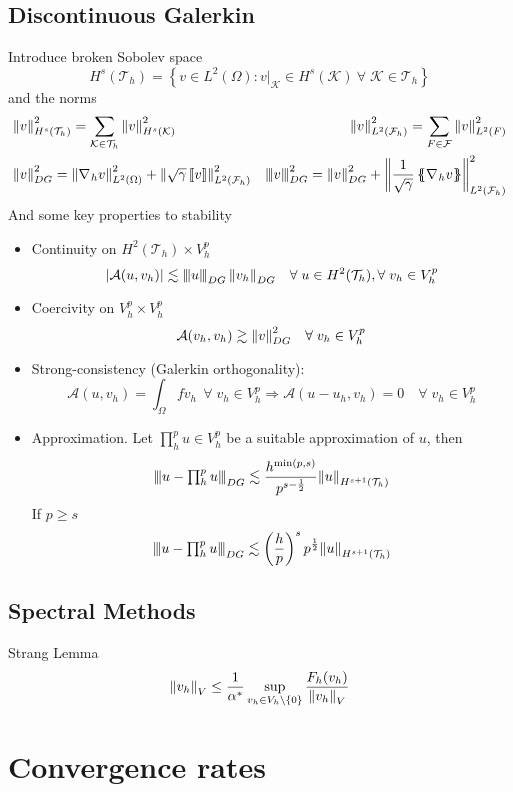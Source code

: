 \documentclass[a4paper,11pt]{article}
\theoremstyle{break}
\renewcommand*{\grad}{\nabla\mspace{1mu}}
\newcommand*{\limited}[1]{\vert_{#1}}
\newcommand*{\threenorm}[3][\null]{\left\lvert\mspace{-2mu}\left\lvert\mspace{-2mu}\left\lvert#2\right\rvert\mspace{-2mu}\right\rvert\mspace{-2mu}\right\rvert_{#3}^{#1}}
\newcommand{\ltwonorm}[1]{\norm{#1}_{L^2(\Omega)}}
\newcommand{\jump}[1]{\left[\!\left[#1\right]\!\right]}
\newcommand{\average}[1]{\left\{\mspace{-6.5mu}\left\{#1\right\}\mspace{-6.5mu}\right\}}
\newcommand{\element}{\mathcal{K}}
\newcommand{\triangulation}{\mathcal{T}_h}
\newcommand{\eit}{{\element\in\triangulation}}
\numberwithin{equation}{section}
\begin{document}
\subsection*{Discontinuous Galerkin}
Introduce broken Sobolev space
\[
    H^s(\triangulation) = \left\{ v \in L^2(\Omega) : v\limited{\element} \in H^s(\element) \ \forall \; \eit \right\}
\]
and the norms 
\begin{align*}
    &\norm{v}^2_{H^s(\triangulation)} = \sum_{\eit} \norm{v}^2_{H^s(\element)} &\norm{v}^2_{L^2(\mathcal{F}_h)} = \sum_{F \in \mathcal{F}} \norm{v}^2_{L^2(F)} \\ 
    &\norm{v}^2_{DG} = \ltwonorm{\grad_h v}^2 + \norm{\sqrt{\gamma}\jump{v}}^2_{L^2(\mathcal{F}_h)} &\threenorm[2]{v}{DG} = \norm{v}^2_{DG} + \norm{\frac{1}{\sqrt{\gamma}} \average{\grad_h v}}^2_{L^2(\mathcal{F}_h)}
\end{align*}
And some key properties to stability
\begin{itemize}
    \item Continuity on \(H^2(\triangulation) \times V_h^p\)
    \[
        \abs{\mathcal{A}(u, v_h)} \lesssim \threenorm{u}{DG} \norm{v_h}_{DG} \quad \forall \; u \in H^2(\triangulation), \forall \; v_h \in V_h^p 
    \]
    \item Coercivity on \(V_h^p \times V_h^p\) 
    \[
        \mathcal{A}(v_h, v_h) \gtrsim \norm{v}^2_{DG} \quad \forall \; v_h \in V_h^p
    \]
    \item  Strong-consistency (Galerkin orthogonality):
    \[
        \mathcal{A}(u,v_h) = \int_\Omega f v_h \ \ \forall \; v_h \in V_h^p \Rightarrow \mathcal{A}(u-u_h, v_h) = 0 \quad \forall \; v_h \in V_h^p
    \]
    \item Approximation. Let \(\prod_{h}^{p}u \in V_h^p\) be a suitable approximation of \(u\), then 
    \[
        \threenorm{u-{\textstyle \prod_{h}^{p}u}}{DG} \lesssim \frac{h^{\min(p,s)}}{p^{s-\frac{1}{2}}}\norm{u}_{H^{s+1}(\triangulation)}
    \]
    If \(p \geq s\)
    \[
        \threenorm{u-{\textstyle \prod_{h}^{p}u}}{DG} \lesssim \left( \frac{h}{p} \right)^s p^{\frac{1}{2}}\norm{u}_{H^{s+1}(\triangulation)}
    \]
\end{itemize}
\subsection*{Spectral Methods}
Strang Lemma 
\[
    \norm{v_h}_V \leq \frac{1}{\alpha^*} \sup_{v_h \in V_h \setminus \left\{ 0 \right\}} \frac{F_h(v_h)}{\norm{v_h}_V}
\]
\section*{Convergence rates}
\end{document}
